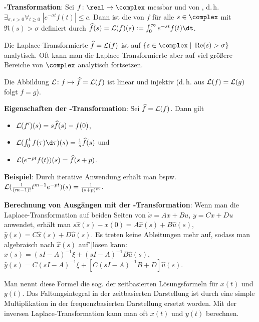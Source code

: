 \textbf{-Transformation}:
Sei $f\colon \real \rightarrow \complex$ messbar und von
, d.\,h.
$\exists_{\sigma, c > 0} \forall_{t \ge 0}\; |e^{-\sigma t} f(t)| \le c$.
Dann ist die  von $f$ für alle
$s \in \complex$ mit $\Re(s) > \sigma$ definiert durch
$\widehat{f}(s) = \L(f)(s) := \int_0^\infty e^{-st} f(t) \dt$.

Die Laplace-Transformierte $\widehat{f} = \mathcal{L}(f)$ ist auf
$\{s \in \complex \;|\; \Re(s) > \sigma\}$ analytisch.
Oft kann man die Laplace-Transformierte aber auf viel größere Bereiche von $\complex$
analytisch fortsetzen.

Die Abbildung $\mathcal{L}\colon f \mapsto \widehat{f} = \mathcal{L}(f)$ ist linear und injektiv
(d.\,h. aus $\mathcal{L}(f) = \mathcal{L}(g)$ folgt $f = g$).

\textbf{Eigenschaften der -Transformation}:
Sei $\widehat{f} = \mathcal{L}(f)$.
Dann gilt
\begin{itemize}
    \item
    $\mathcal{L}(f')(s) = s \widehat{f}(s) - f(0)$,

    \item
    $\L(\int_0^t f(\tau)\d\tau)(s) = \frac{1}{s} \widehat{f}(s)$ und

    \item
    $\mathcal{L}(e^{-pt} f(t))(s) = \widehat{f}(s + p)$.
\end{itemize}

\textbf{Beispiel}:
Durch iterative Anwendung erhält man bspw.
$\mathcal{L}(\frac{1}{(m-1)!} t^{m-1} e^{-pt})(s) = \frac{1}{(s + p)^m}$.

\linie

\textbf{Berechnung von Ausgängen mit der -Transformation}:
Wenn man die Laplace-Transformation auf beiden Seiten von $\dot{x} = Ax + Bu$, $y = Cx + Du$
anwendet, erhält man
$s \widehat{x}(s) - x(0) = A\widehat{x}(s) + B\widehat{u}(s)$,
$\widehat{y}(s) = C\widehat{x}(s) + D\widehat{u}(s)$.
Es treten keine Ableitungen mehr auf, sodass man algebraisch nach $\widehat{x}(s)$ auf"|lösen kann:
$\widehat{x}(s) = (sI - A)^{-1} \xi + (sI - A)^{-1} B \widehat{u}(s)$,
$\widehat{y}(s) = C (sI - A)^{-1} \xi + [C (sI - A)^{-1} B + D] \widehat{u}(s)$.

Man nennt diese Formel die sog. 
der zeitbasierten Lösungsformeln für $x(t)$ und $y(t)$.
Das Faltungsintegral in der zeitbasierten Darstellung ist durch eine simple Multiplikation
in der frequenzbasierten Darstellung ersetzt worden.
Mit der inversen Laplace-Transformation kann man oft $x(t)$ und $y(t)$ berechnen.

